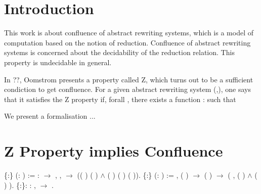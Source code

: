 
\begin{coqdoccode}
\end{coqdoccode}
\section{Introduction}





    This work is about confluence of abstract rewriting systems, which
    is a model of computation based on the notion of
    reduction. Confluence of abstract rewriting systems is concerned
    about the decidability of the reduction relation. This property is
    undecidable in general.


    In ??, Oomstrom presents a property called Z, which turns out to be a sufficient condiction to get confluence. For a given abstract rewriting system (,), one says that it satisfies the Z property if, forall ,   there exists a function :    such that 


We present a formalisation ...




\section{Z Property implies Confluence}

\begin{coqdoccode}
\coqdocemptyline
\coqdocnoindent
{}  \{:\} (:  ) := \coqdoctac{\ensuremath{\exists}} : \ensuremath{\rightarrow} , \coqdockw{\ensuremath{\forall}}  ,    \ensuremath{\rightarrow} (( )  ( ) \ensuremath{\land} ( ) ( ) ( )).\coqdoceol
\coqdocemptyline
\coqdocnoindent
{}  \{:\} (:  ) := \coqdockw{\ensuremath{\forall}}   , ( )   \ensuremath{\rightarrow} ( )   \ensuremath{\rightarrow} (\coqdoctac{\ensuremath{\exists}} , ( )   \ensuremath{\land} ( )  ).\coqdoceol
\coqdocemptyline
\coqdocnoindent
{}  \{:\}: \coqdockw{\ensuremath{\forall}} :  ,   \ensuremath{\rightarrow}  .\coqdoceol
\end{coqdoccode}
